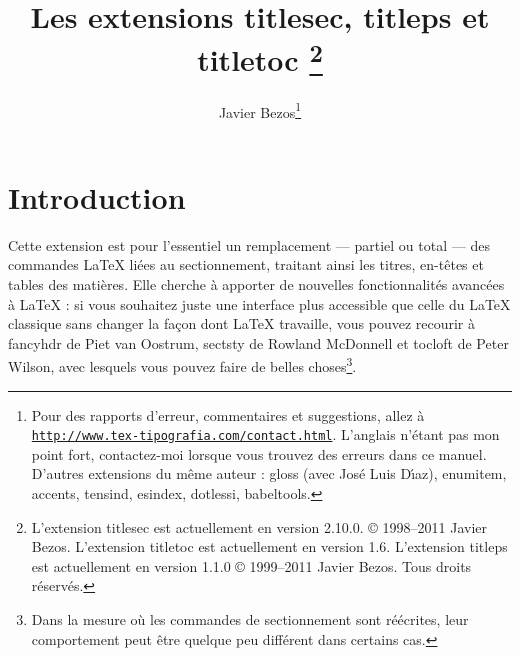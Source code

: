 \documentclass[a4paper]{ltxguide}
\title{Les extensions \textsf{titlesec}, \textsf{titleps} et \textsf{titletoc} 
\footnote{L'extension \textsf{titlesec} est actuellement en version 2.10.0.  
\copyright{} 1998--2011 Javier Bezos. L'extension \textsf{titletoc} est actuellement 
en version 1.6. L'extension \textsf{titleps} est actuellement en version 1.1.0  
\copyright{} 1999--2011 Javier Bezos. Tous droits réservés.}}
\author{Javier Bezos\footnote{Pour des rapports d'erreur, commentaires et 
suggestions, allez à \href{http://www.tex-tipografia.com/contact.html}%
{\texttt{http://www.tex-tipografia.com/contact.html}}.  L'anglais n'étant pas mon 
point fort, contactez-moi lorsque vous trouvez des erreurs dans ce manuel.  
D'autres extensions du même auteur : \textsf{gloss} (avec
Jos\'e Luis D\'{\i}az), \textsf{enumitem, accents, tensind, esindex,
dotlessi, babeltools}.}}
\date{\docdate}
\begin{document}
\maketitle
\tableofcontents
\section{Introduction}

Cette extension est pour l'essentiel un remplacement --- partiel ou total --- des 
commandes \LaTeX{} liées au sectionnement, traitant ainsi les titres, en-têtes et 
tables des matières. Elle cherche à apporter de nouvelles fonctionnalités avancées à
 \LaTeX{} : si vous souhaitez juste une interface plus accessible 
que celle du \LaTeX{} classique sans changer la façon dont \LaTeX{} travaille, 
vous pouvez recourir à \textsf{fancyhdr} de Piet van Oostrum, \textsf{sectsty} de 
Rowland McDonnell et \textsf{tocloft} de Peter Wilson, avec lesquels vous pouvez 
faire de belles choses\footnote{Dans la mesure où les commandes de sectionnement 
sont réécrites, leur comportement peut être quelque peu différent dans certains 
cas.}.
\end{document}
